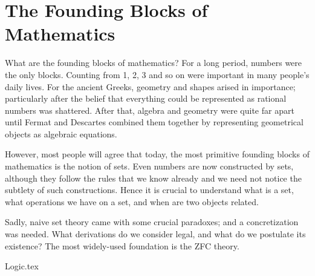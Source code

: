 \part[Blocks]{The Founding Blocks of Mathematics}
\label{prt:blocks}

What are the founding blocks of mathematics?
For a long period, numbers were the only blocks.
Counting from 1, 2, 3 and so on were important
in many people's daily lives.
For the ancient Greeks,
geometry and shapes arised in importance;
particularly after
the belief that everything could be represented as rational numbers
was shattered.
After that, algebra and geometry were quite far apart
until Fermat and Descartes combined them together
by representing geometrical objects as algebraic equations.

However, most people will agree that
today, the most primitive founding blocks of mathematics
is the notion of sets.
Even numbers are now constructed by sets,
although they follow the rules that we know already
and we need not notice the subtlety of such constructions.
Hence it is crucial to understand
what is a set,
what operations we have on a set,
and when are two objects related.

Sadly, naive set theory came with some crucial paradoxes;
and a concretization was needed.
What derivations do we consider legal,
and what do we postulate its existence?
The most widely-used foundation is the ZFC theory.

{Logic.tex}
